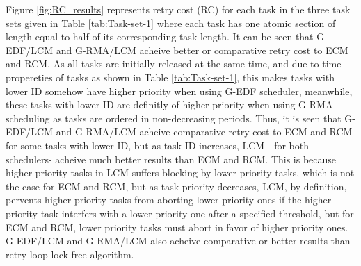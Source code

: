 \documentclass[conference]{sig-alternate}
\begin{document}
Figure \ref{fig:RC_results} represents retry cost (RC) for each task
in the three task sets given in Table \ref{tab:Task-set-1} where
each task has one atomic section of length equal to half of its corresponding
task length. It can be seen that G-EDF/LCM and G-RMA/LCM acheive better
or comparative retry cost to ECM and RCM. As all tasks are initially
released at the same time, and due to time propereties of tasks as
shown in Table \ref{tab:Task-set-1}, this makes tasks with lower
ID somehow have higher priority when using G-EDF scheduler, meanwhile,
these tasks with lower ID are definitly of higher priority when using
G-RMA scheduling as tasks are ordered in non-decreasing periods. Thus,
it is seen that G-EDF/LCM and G-RMA/LCM acheive comparative retry cost
to ECM and RCM for some tasks with lower ID, but as task ID increases,
LCM - for both schedulers- acheive much better results than ECM and
RCM. This is because higher priority tasks in LCM suffers blocking
by lower priority tasks, which is not the case for ECM and RCM, but
as task priority decreases, LCM, by definition, pervents higher priority
tasks from aborting lower priority ones if the higher priority task
interfers with a lower priority one after a specified threshold, but
for ECM and RCM, lower priority tasks must abort in favor of higher
priority ones. G-EDF/LCM and G-RMA/LCM also acheive comparative or better
results than retry-loop lock-free algorithm.
\end{document}
